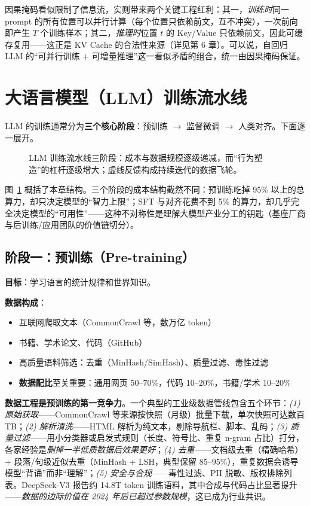 \documentclass[12pt,a4paper]{article}
\begin{document}
因果掩码看似限制了信息流，实则带来两个关键工程红利：其一，\emph{训练时}同一 prompt 的所有位置可以并行计算（每个位置只依赖前文，互不冲突），一次前向即产生 $T$ 个训练样本；其二，\emph{推理时}位置 $t$ 的 Key/Value 只依赖前文，因此可缓存复用——这正是 KV Cache 的合法性来源（详见第 6 章）。可以说，自回归 LLM 的“可并行训练 + 可增量推理”这一看似矛盾的组合，统一由因果掩码保证。

\section{大语言模型（LLM）训练流水线}

LLM 的训练通常分为\textbf{三个核心阶段}：预训练 $\to$ 监督微调 $\to$ 人类对齐。下面逐一展开。

\begin{figure}[htbp]
\centering

\caption{LLM 训练流水线三阶段：成本与数据规模逐级递减，而“行为塑造”的杠杆逐级增大；虚线反馈构成持续迭代的数据飞轮。}
\label{fig:pipeline}
\end{figure}

图~\ref{fig:pipeline} 概括了本章结构。三个阶段的成本结构截然不同：预训练吃掉 95\% 以上的总算力，却只决定模型的“智力上限”；SFT 与对齐花费不到 5\% 的算力，却几乎完全决定模型的“可用性”——这种不对称性是理解大模型产业分工的钥匙（基座厂商与后训练/应用团队的价值链切分）。

\subsection{阶段一：预训练（Pre-training）}

\textbf{目标}：学习语言的统计规律和世界知识。

\textbf{数据构成}：
\begin{itemize}
  \item 互联网爬取文本（CommonCrawl 等，数万亿 token）
  \item 书籍、学术论文、代码（GitHub）
  \item 高质量语料筛选：去重（MinHash/SimHash）、质量过滤、毒性过滤
  \item \textbf{数据配比}至关重要：通用网页 50--70\%，代码 10--20\%，书籍/学术 10--20\%
\end{itemize}

\textbf{数据工程是预训练的第一竞争力}。一个典型的工业级数据管线包含五个环节：\emph{(1) 原始获取}——CommonCrawl 等来源按快照（月级）批量下载，单次快照可达数百 TB；\emph{(2) 解析清洗}——HTML 解析为纯文本，剔除导航栏、脚本、乱码；\emph{(3) 质量过滤}——用小分类器或启发式规则（长度、符号比、重复 n-gram 占比）打分，各家经验是\emph{删掉一半低质数据后效果更好}；\emph{(4) 去重}——文档级去重（精确哈希）+ 段落/句级近似去重（MinHash + LSH，典型保留 85--95\%），重复数据会诱导模型“背诵”而非“理解”；\emph{(5) 安全与合规}——毒性过滤、PII 脱敏、版权排除列表。DeepSeek-V3 报告约 14.8T token 训练语料，其中合成与代码占比显著提升——\emph{数据的边际价值在 2024 年后已超过参数规模}，这已成为行业共识。
\end{document}
